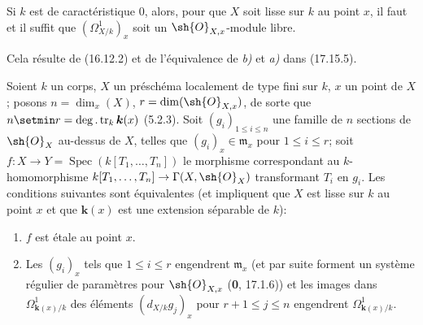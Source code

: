 \begin{corollary}[17.15.7]
\label{IV.17.15.7}
Si $k$ est de caractéristique \textup{0}, alors, pour que $X$ soit lisse sur $k$ au point $x$, il faut et il suffit que $(\varOmega^1_{X/k})_x$ soit un $\sh{O}_{X,x}$-module libre.
\end{corollary}

Cela résulte de (16.12.2) et de l'équivalence de \emph{b)} et \emph{a)} dans (17.15.5).

\begin{proposition}[17.15.8]
\label{IV.17.15.8}
Soient $k$ un corps, $X$ un préschéma localement de type fini sur $k$, $x$ un point de $X$; posons $n=\dim_x(X)$, $r=\dim(\sh{O}_{X,x})$, de sorte que $n\setmin r=\deg.\operatorname{tr}_k \boldsymbol{k}(x)$ \textup{(5.2.3)}. Soit $(g_i)_{1\leq i\leq n}$ une famille de $n$ sections de $\sh{O}_X$ au-dessus de $X$, telles que $(g_i)_x\in\mathfrak m_x$ pour $1\leq i\leq r$; soit $f:X\to Y=\operatorname{Spec}(k[T_1,\ldots,T_n])$ le morphisme correspondant au $k$-homomorphisme $k[T_1,\ldots,T_n]\to\Gamma(X,\sh{O}_X)$ transformant $T_i$ en $g_i$. Les conditions suivantes sont équivalentes (et impliquent que $X$ est lisse sur $k$ au point $x$ et que $\boldsymbol{k}(x)$ est une extension séparable de $k$):
\begin{enumerate}
  \item[\textup{a)}] $f$ est étale au point $x$.


  \item[\textup{b)}] Les $(g_i)_x$ tels que $1\leq i\leq r$ engendrent $\mathfrak m_x$ \textup{(et par suite forment un système régulier de paramètres pour $\sh{O}_{X,x}$ (\textbf{0}, 17.1.6))} et les images dans $\Omega^1_{\mathbf{k}(x)/k}$ des éléments $(d_{X/k}g_j)_x$ pour $r+1\leq j\leq n$ engendrent $\Omega^1_{\mathbf{k}(x)/k}$.
\end{enumerate}
\end{proposition}

